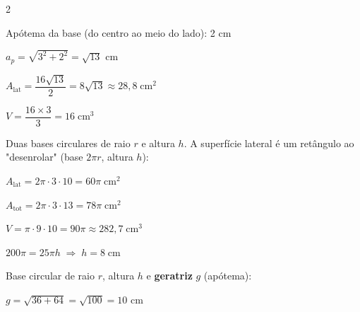 \documentclass[12pt]{article}
\begin{document}
\begin{multicols}{2}

Apótema da base (do centro ao meio do lado): 2 cm

$a_p = \sqrt{3^2 + 2^2} = \sqrt{13}$ cm

$A_{\text{lat}} = \dfrac{16\sqrt{13}}{2} = 8\sqrt{13} \approx 28{,}8\;\text{cm}^2$

$V = \dfrac{16 \times 3}{3} = \boxed{16\;\text{cm}^3}$


Duas bases circulares de raio $r$ e altura $h$. A superfície lateral é um retângulo
ao "desenrolar" (base $2\pi r$, altura $h$):

\vspace{-8pt}
\vspace{-8pt}


$A_{\text{lat}} = 2\pi \cdot 3 \cdot 10 = 60\pi\;\text{cm}^2$

$A_{\text{tot}} = 2\pi \cdot 3 \cdot 13 = 78\pi\;\text{cm}^2$

$V = \pi \cdot 9 \cdot 10 = 90\pi \approx 282{,}7\;\text{cm}^3$


$200\pi = 25\pi h \;\Rightarrow\; h = \boxed{8\;\text{cm}}$


Base circular de raio $r$, altura $h$ e \textbf{geratriz} $g$ (apótema):

\vspace{-8pt}
\vspace{-8pt}
\vspace{-8pt}



$g = \sqrt{36+64} = \sqrt{100} = 10$ cm


\end{multicols}
\end{document}
